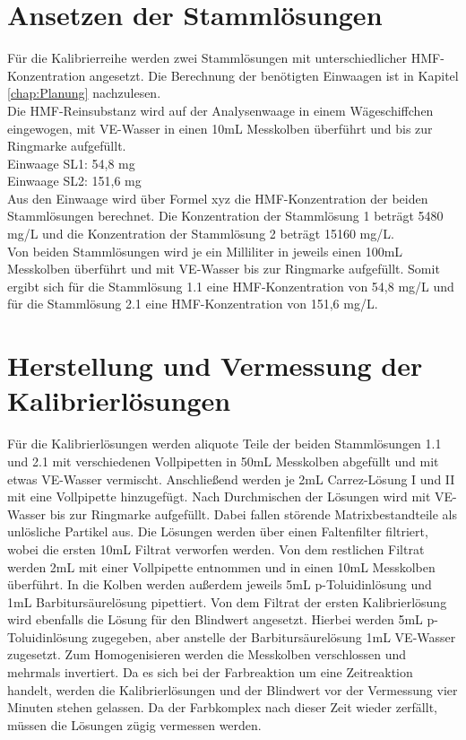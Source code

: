 \section{Ansetzen der Stammlösungen}

Für die Kalibrierreihe werden zwei Stammlösungen mit unterschiedlicher HMF-Konzentration angesetzt. Die Berechnung der benötigten Einwaagen ist in Kapitel \ref{chap:Planung} nachzulesen.\\
Die HMF-Reinsubstanz wird auf der Analysenwaage in einem Wägeschiffchen eingewogen, mit VE-Wasser in einen 10mL Messkolben überführt und bis zur Ringmarke aufgefüllt.\\

Einwaage SL1: 54,8 mg\\
Einwaage SL2: 151,6 mg\\

Aus den Einwaage wird über Formel xyz die HMF-Konzentration der beiden Stammlösungen berechnet. Die Konzentration der Stammlösung 1 beträgt 5480 mg/L und die Konzentration der Stammlösung 2 beträgt 15160 mg/L.\\ 
Von beiden Stammlösungen wird je ein Milliliter in jeweils einen 100mL Messkolben überführt und mit VE-Wasser bis zur Ringmarke aufgefüllt. Somit ergibt sich für die Stammlösung 1.1 eine HMF-Konzentration von 54,8 mg/L und für die Stammlösung 2.1 eine HMF-Konzentration von 151,6 mg/L. 

\section{Herstellung und Vermessung der Kalibrierlösungen}

Für die Kalibrierlösungen werden aliquote Teile der beiden Stammlösungen 1.1 und 2.1 mit verschiedenen Vollpipetten in 50mL Messkolben abgefüllt und mit etwas VE-Wasser vermischt. Anschließend werden je 2mL Carrez-Lösung I und II mit eine Vollpipette hinzugefügt. Nach Durchmischen der Lösungen wird mit VE-Wasser bis zur Ringmarke aufgefüllt. Dabei fallen störende Matrixbestandteile als unlösliche Partikel aus. Die Lösungen werden über einen Faltenfilter filtriert, wobei die ersten 10mL Filtrat verworfen werden. Von dem restlichen Filtrat werden 2mL mit einer Vollpipette entnommen und in einen 10mL Messkolben überführt. In die Kolben werden außerdem jeweils 5mL p-Toluidinlösung und 1mL Barbitursäurelösung pipettiert. Von dem Filtrat der ersten Kalibrierlösung wird ebenfalls die Lösung für den Blindwert angesetzt. Hierbei werden 5mL p-Toluidinlösung zugegeben, aber anstelle der Barbitursäurelösung 1mL VE-Wasser zugesetzt. Zum Homogenisieren werden die Messkolben verschlossen und mehrmals invertiert. Da es sich bei der Farbreaktion um eine Zeitreaktion handelt, werden die Kalibrierlösungen und der Blindwert vor der Vermessung vier Minuten stehen gelassen. Da der Farbkomplex nach dieser Zeit wieder zerfällt, müssen die Lösungen zügig vermessen werden.


